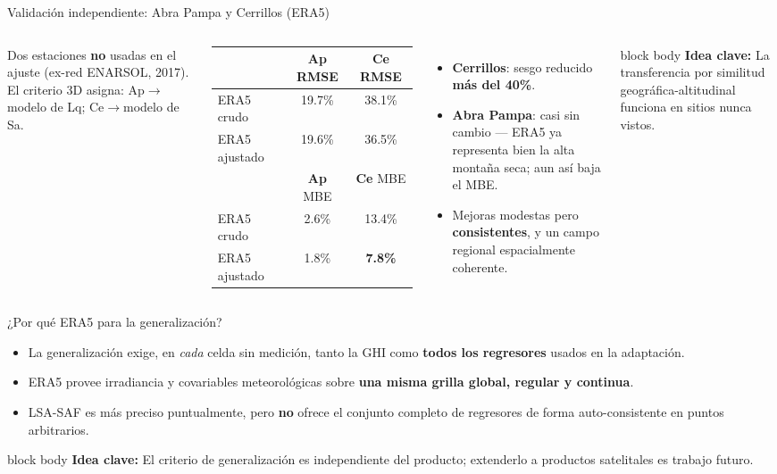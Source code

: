\documentclass[aspectratio=169,11pt]{beamer}
\newcommand{\clave}[1]{%
  \begin{beamercolorbox}[wd=\linewidth,sep=6pt,rounded=true]{block body}%
    \footnotesize\textbf{\color{primary}Idea clave: }#1%
  \end{beamercolorbox}}
\begin{document}
\begin{frame}{Validación independiente: Abra Pampa y Cerrillos (ERA5)}
  \scriptsize
  \begin{columns}[T]
    Dos estaciones \textbf{no} usadas en el ajuste (ex-red ENARSOL, 2017). El criterio 3D asigna: Ap$\to$modelo de Lq; Ce$\to$modelo de Sa.
    \vspace{0.4em}
    \renewcommand{\arraystretch}{1.2}
    \begin{tabular}{@{}lcc@{}}
      \toprule
       & \textbf{Ap} RMSE & \textbf{Ce} RMSE\\
      \midrule
      ERA5 crudo    & 19.7\% & 38.1\%\\
      ERA5 ajustado & 19.6\% & 36.5\%\\
      \midrule
       & \textbf{Ap} MBE & \textbf{Ce} MBE\\
      \midrule
      ERA5 crudo    & 2.6\% & 13.4\%\\
      ERA5 ajustado & 1.8\% & \textbf{7.8\%}\\
      \bottomrule
    \end{tabular}
    \begin{itemize}
      \item \textbf{Cerrillos}: sesgo reducido \textbf{más del 40\%}.
      \item \textbf{Abra Pampa}: casi sin cambio — ERA5 ya representa bien la alta montaña seca; aun así baja el MBE.
      \item Mejoras modestas pero \textbf{consistentes}, y un campo regional espacialmente coherente.
    \end{itemize}
    \clave{La transferencia por similitud geográfica-altitudinal funciona en sitios nunca vistos.}
  \end{columns}
\end{frame}

\begin{frame}{¿Por qué ERA5 para la generalización?}
  \footnotesize
  \begin{itemize}
    \item La generalización exige, en \emph{cada} celda sin medición, tanto la GHI como \textbf{todos los regresores} usados en la adaptación.
    \item ERA5 provee irradiancia y covariables meteorológicas sobre \textbf{una misma grilla global, regular y continua}.
    \item LSA-SAF es más preciso puntualmente, pero \textbf{no} ofrece el conjunto completo de regresores de forma auto-consistente en puntos arbitrarios.
  \end{itemize}
  \vspace{0.3em}
  \clave{El criterio de generalización es independiente del producto; extenderlo a productos satelitales es trabajo futuro.}
\end{frame}
\end{document}
